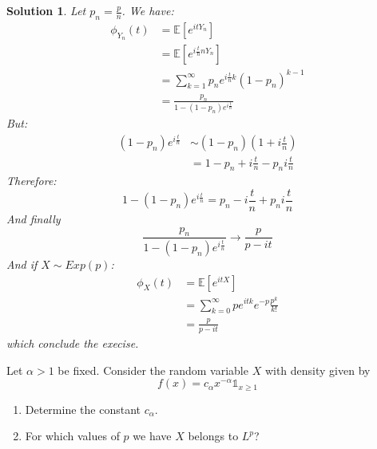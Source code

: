 \documentclass{article}
\newcommand{\esperance}[1]{\mathbb{E}[#1]}
\newtheorem{solution}{Solution}
\begin{document}
\begin{solution}
  Let $p_n = \frac{p}{n}$. We have:
  \begin{align*}
    \phi_{Y_n}(t) & = \esperance{e^{itY_n}}                                     \\
                  & = \esperance{e^{i \frac{t}{n} nY_n}}                        \\
                  & = \sum_{k = 1}^\infty p_n e^{i\frac{t}{n}k} {(1-p_n)}^{k-1} \\
                  & = \frac{p_n}{1 - (1-p_n) e^{i\frac{t}{n}}}
  \end{align*}
  But:
  \begin{align*}
    (1-p_n) e^{i\frac{t}{n}} & \sim (1-p_n) (1 + i \frac{t}{n})              \\
                             & = 1 - p_n + i \frac{t}{n} - p_n i \frac{t}{n}
  \end{align*}
  Therefore:
  \[
    1 - (1-p_n) e^{i\frac{t}{n}} = p_n - i \frac{t}{n} + p_n i \frac{t}{n}
  \]
  And finally
  \[
    \frac{p_n}{1 - (1-p_n) e^{i\frac{t}{n}}} \to \frac{p}{p - it}
  \]
  And if $X \sim Exp(p)$:
  \begin{align*}
    \phi_{X}(t) & = \esperance{e^{itX}}                                 \\
                & = \sum_{k = 0}^\infty p e^{itk} e^{-p} \frac{p^k}{k!} \\
                & = \frac{p}{p-it}
  \end{align*}
  which conclude the execise.
\end{solution}

\begin{Exercise} Let $\alpha>1$ be fixed. Consider the random variable $X$ with density given by
  \[
    f(x)=c_{\alpha} x^{-\alpha} \mathbb{1}_{x \geq 1}
  \]
  \begin{enumerate}
    \item Determine the constant $c_{\alpha}$.
    \item For which values of $p$ we have $X$ belongs to $L^{p}$?
  \end{enumerate}
\end{Exercise}
\end{document}
